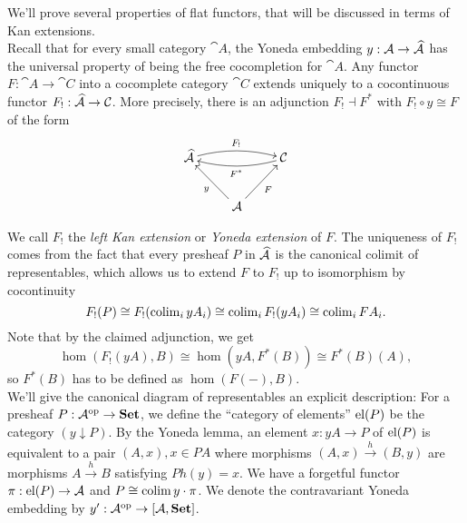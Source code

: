 We'll prove several properties of flat functors, that will be discussed in terms of Kan extensions. \\

Recall that for every small category $\cat A$, the Yoneda embedding $y : \mathcal{A} \to \widehat{\mathcal{A}}$ has the universal property of being the free cocompletion for $\cat A$. Any functor $F : \cat A \to \cat C$ into a cocomplete category $\cat C$ extends uniquely to a cocontinuous functor $F_!: \widehat{\mathcal{A}} \to \mathcal{C}$. More precisely, there is an adjunction $F_! \dashv F^*$ with $F_! \circ y \cong F$ of the form
\[
\xymatrix{
\pre{\cat A} \ar@/^/[rr]^{F_!} & & \cat C \ar@/^/[ll]^{F^*} \\
& \cat A \ar[lu]^{y} \ar[ru]_{F}
}\]

We call $F_!$ the \emph{left Kan extension} or \emph{Yoneda extension} of $F$. The uniqueness of $F_!$ comes from the fact that every presheaf $P$ in $\widehat{\mathcal{A}}$ is the canonical colimit of representables, which allows us to extend $F$ to $F_!$ up to isomorphism by cocontinuity
\[ F_!(P) \cong F_!(\operatorname{colim}_i yA_i) \cong \operatorname{colim}_i F_!(yA_i) \cong \operatorname{colim}_i FA_i. \]
Note that by the claimed adjunction, we get
\[ \hom(F_!(yA),B) \cong \hom(yA,F^*(B)) \cong F^*(B)(A), \]
so $F^*(B)$ has to be defined as $\hom(F(-),B)$. \\

We'll give the canonical diagram of representables an explicit description: For a presheaf $P : \mathcal{A}^{\textrm{op}} \to \mathbf{Set}$, we define the ``category of elements'' $\textrm{el}(P)$ be the category $(y \downarrow P)$. By the Yoneda lemma, an element $x : yA \to P$ of $\textrm{el}(P)$ is equivalent to a pair $(A,x), x \in PA$ where morphisms $(A,x) \xrightarrow{h} (B,y)$ are morphisms $A \xrightarrow{h} B$ satisfying $Ph(y) = x$. We have a forgetful functor $\pi : \textrm{el}(P) \to \mathcal{A}$ and $P \cong \operatorname{colim} y\cdot \pi$. We denote the contravariant Yoneda embedding by $y' : \mathcal{A}^{\textrm{op}} \to [\mathcal{A},\mathbf{Set}]$.

